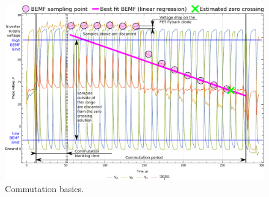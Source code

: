 \documentclass{zubaxdoc}
\begin{document}
\begin{figure}[hb]
    \centering
	\includegraphics[width=\textwidth]{phase_voltages_braking_high_advance_angle}
	\caption{Commutation basics.\label{phase_voltages_braking_high_advance_angle}}
\end{figure}
\end{document}
